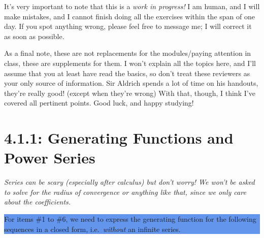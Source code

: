 \documentclass{article}
\begin{document}
It's very important to note that this is a \textit{work in progress!} I am human, and I will make mistakes, and I cannot finish doing all the exercises within the span of one day. If you spot anything wrong, 
please feel free to message me; I will correct it as soon as possible.\par
As a final note, these are not replacements for the modules/paying attention in class, these are supplements for them. I won't explain all the topics here, and I'll assume that you at least have 
read the basics, so don't treat these reviewers as your only source of information. Sir Aldrich spends a lot of time on his handouts, they're really good! (except when they're wrong) With that, though, I think 
I've covered all pertinent points. Good luck, and happy studying!
\pagebreak 
\section*{4.1.1: Generating Functions and Power Series} 
\textit{Series can be scary (especially after calculus) but don't worry! We won't be asked to solve for the radius of convergence or anything like that, since we only care about the coefficients.}\par
{}
\parindent=25.0pt \colorbox{CornflowerBlue}{
%
\begin{minipage}[c]{0.9\textwidth}
    \centering
    For items \#1 to \#6, we need to express the generating function for the following sequences in a closed form, i.e.\ \textit{without} an 
    infinite series. 
\end{minipage}%
}%
\end{document}

